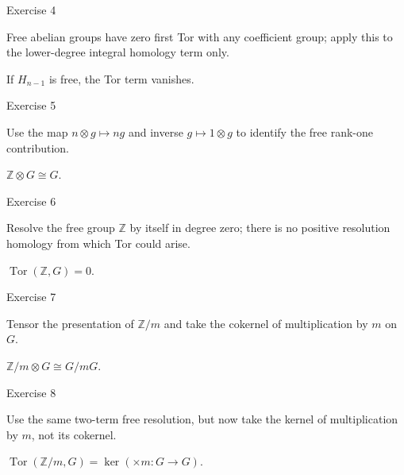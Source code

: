 \begin{exercise}\label{exr:viii26-04}
Exercise 4
\end{exercise}
\begin{hint}
Free abelian groups have zero first Tor with any coefficient group; apply this to the lower-degree integral homology term only.
\end{hint}
\begin{solution}
If \(H_{n-1}\) is free, the Tor term vanishes.
\end{solution}

\begin{exercise}\label{exr:viii26-05}
Exercise 5
\end{exercise}
\begin{hint}
Use the map \(n\otimes g\mapsto ng\) and inverse \(g\mapsto1\otimes g\) to identify the free rank-one contribution.
\end{hint}
\begin{solution}
\(\mathbb Z\otimes G\cong G\).
\end{solution}

\begin{exercise}\label{exr:viii26-06}
Exercise 6
\end{exercise}
\begin{hint}
Resolve the free group \(\mathbb Z\) by itself in degree zero; there is no positive resolution homology from which Tor could arise.
\end{hint}
\begin{solution}
\(\operatorname{Tor}(\mathbb Z,G)=0\).
\end{solution}

\begin{exercise}\label{exr:viii26-07}
Exercise 7
\end{exercise}
\begin{hint}
Tensor the presentation of \(\mathbb Z/m\) and take the cokernel of multiplication by \(m\) on \(G\).
\end{hint}
\begin{solution}
\(\mathbb Z/m\otimes G\cong G/mG\).
\end{solution}

\begin{exercise}\label{exr:viii26-08}
Exercise 8
\end{exercise}
\begin{hint}
Use the same two-term free resolution, but now take the kernel of multiplication by \(m\), not its cokernel.
\end{hint}
\begin{solution}
\(\operatorname{Tor}(\mathbb Z/m,G)=\ker(\times m:G\to G)\).
\end{solution}

